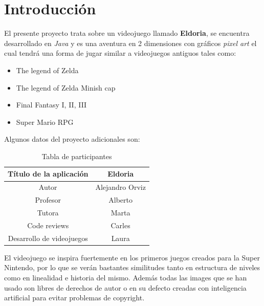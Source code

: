 \documentclass[a4paper]{article}
\begin{document}
\clearpage
\section{Introducción}
El presente proyecto trata sobre un videojuego llamado \textbf{Eldoria}, se encuentra desarrollado en \textit{Java} y es una aventura en 2 dimensiones con gráficos \textit{pixel art}
el cual tendrá una forma de jugar similar a videojuegos antiguos tales como:
\begin{itemize}
    \item The legend of Zelda
    \item The legend of Zelda Minish cap
    \item Final Fantasy I, II, III
    \item Super Mario RPG
\end{itemize}
Algunos datos del proyecto adicionales son:

\begin{table}[ht]
    \centering
    \begin{tabular}{| c | c |}
        \hline
        Título de la aplicación   & Eldoria         \\ \hline
        Autor                     & Alejandro Orviz \\ \hline
        Profesor                  & Alberto         \\ \hline
        Tutora                    & Marta           \\ \hline
        Code reviews              & Carles          \\ \hline
        Desarrollo de videojuegos & Laura           \\ \hline
    \end{tabular}
    \caption{Tabla de participantes}
    \label{tab:participantes}
\end{table}

El videojuego se inspira fuertemente en los primeros juegos creados para la Super Nintendo, por lo que se verán bastantes similitudes tanto en estructura de niveles
como en linealidad e historia del mismo. Además todas las images que se han usado son libres de derechos de autor o en su defecto creadas con inteligencia artificial para evitar problemas de copyright.

\clearpage
\end{document}
